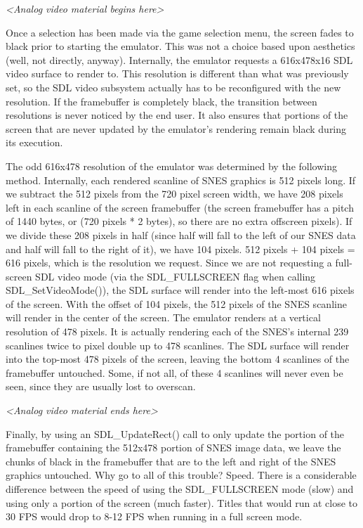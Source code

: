 \emph{<Analog video material begins here>}

Once a selection has been made via the game selection menu, the screen fades to black prior to starting the emulator. This was not a choice based upon aesthetics (well, not directly, anyway). Internally, the emulator requests a 616x478x16 SDL video surface to render to. This resolution is different than what was previously set, so the SDL video subsystem actually has to be reconfigured with the new resolution. If the framebuffer is completely black, the transition between resolutions is never noticed by the end user. It also ensures that portions of the screen that are never updated by the emulator's rendering remain black during its execution.

The odd 616x478 resolution of the emulator was determined by the following method. Internally, each rendered scanline of SNES graphics is 512 pixels long. If we subtract the 512 pixels from the 720 pixel screen width, we have 208 pixels left in each scanline of the screen framebuffer (the screen framebuffer has a pitch of 1440 bytes, or (720 pixels * 2 bytes), so there are no extra offscreen pixels). If we divide these 208 pixels in half (since half will fall to the left of our SNES data and half will fall to the right of it), we have 104 pixels. 512 pixels + 104 pixels = 616 pixels, which is the resolution we request. Since we are not requesting a full-screen SDL video mode (via the SDL\_FULLSCREEN flag when calling SDL\_SetVideoMode()), the SDL surface will render into the left-most 616 pixels of the screen. With the offset of 104 pixels, the 512 pixels of the SNES scanline will render in the center of the screen. The emulator renders at a vertical resolution of 478 pixels. It is actually rendering each of the SNES's internal 239 scanlines twice to pixel double up to 478 scanlines. The SDL surface will render into the top-most 478 pixels of the screen, leaving the bottom 4 scanlines of the framebuffer untouched. Some, if not all, of these 4 scanlines will never even be seen, since they are usually lost to overscan.

\emph{<Analog video material ends here>}

Finally, by using an SDL\_UpdateRect() call to only update the portion of the framebuffer containing the 512x478 portion of SNES image data, we leave the chunks of black in the framebuffer that are to the left and right of the SNES graphics untouched. Why go to all of this trouble? Speed. There is a considerable difference between the speed of using the SDL\_FULLSCREEN mode (slow) and using only a portion of the screen (much faster). Titles that would run at close to 30 FPS would drop to 8-12 FPS when running in a full screen mode.

